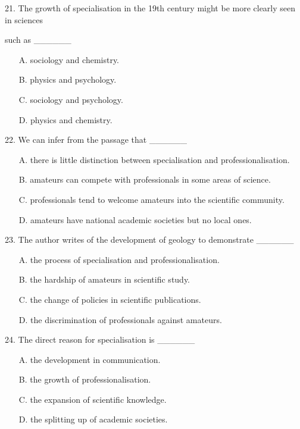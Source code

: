 \documentclass[UTF8,11pt]{ctexart}
\begin{document}
21. The growth of specialisation in the 19th century might be more clearly seen in sciences


such as \_\_\_\_\_\_


\begin{itemize}[leftmargin=2em,itemsep=.2em,topsep=.4em]\item[A.] sociology and chemistry.
\item[B.] physics and psychology.
\item[C.] sociology and psychology.
\item[D.] physics and chemistry.
\end{itemize}

22. We can infer from the passage that \_\_\_\_\_\_


\begin{itemize}[leftmargin=2em,itemsep=.2em,topsep=.4em]\item[A.] there is little distinction between specialisation and professionalisation.
\item[B.] amateurs can compete with professionals in some areas of science.
\item[C.] professionals tend to welcome amateurs into the scientific community.
\item[D.] amateurs have national academic societies but no local ones.
\end{itemize}

23. The author writes of the development of geology to demonstrate \_\_\_\_\_\_


\begin{itemize}[leftmargin=2em,itemsep=.2em,topsep=.4em]\item[A.] the process of specialisation and professionalisation.
\item[B.] the hardship of amateurs in scientific study.
\item[C.] the change of policies in scientific publications.
\item[D.] the discrimination of professionals against amateurs.
\end{itemize}

24. The direct reason for specialisation is \_\_\_\_\_\_


\begin{itemize}[leftmargin=2em,itemsep=.2em,topsep=.4em]\item[A.] the development in communication.
\item[B.] the growth of professionalisation.
\item[C.] the expansion of scientific knowledge.
\item[D.] the splitting up of academic societies.
\end{itemize}
\end{document}
